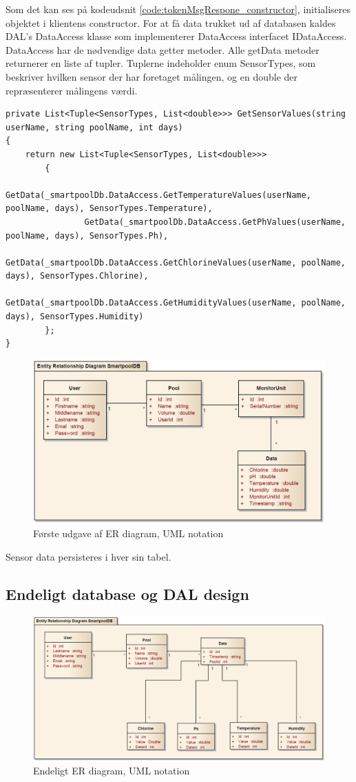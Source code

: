 Som det kan ses på kodeudsnit \ref{code:tokenMsgRespone_constructor}, initialiseres objektet i klientens constructor.
For at få data trukket ud af databasen kaldes DAL's DataAccess klasse som implementerer DataAccess interfacet IDataAccess. DataAccess har de nødvendige data getter metoder. Alle getData metoder returnerer en liste af tupler. Tuplerne indeholder enum SensorTypes, som beskriver hvilken sensor der har foretaget målingen, og en double der repræsenterer målingens værdi.

\begin{lstlisting}
private List<Tuple<SensorTypes, List<double>>> GetSensorValues(string userName, string poolName, int days)
{
	return new List<Tuple<SensorTypes, List<double>>>
		{
				GetData(_smartpoolDb.DataAccess.GetTemperatureValues(userName, poolName, days), SensorTypes.Temperature),
				GetData(_smartpoolDb.DataAccess.GetPhValues(userName, poolName, days), SensorTypes.Ph),
				GetData(_smartpoolDb.DataAccess.GetChlorineValues(userName, poolName, days), SensorTypes.Chlorine),
				GetData(_smartpoolDb.DataAccess.GetHumidityValues(userName, poolName, days), SensorTypes.Humidity)
		};
}
\end{lstlisting}




\begin{figure}
	\centering
	\includegraphics[width=\linewidth]{figs/design/databaseERD_old_uml}
	\caption{Første udgave af ER diagram, UML notation}
	\label{fig:databaseERD_old_uml}
\end{figure}

Sensor data persisteres i hver sin tabel.

\subsection{Endeligt database og DAL design}

\begin{figure}
\centering
\includegraphics[width=\linewidth]{figs/design/databaseERD_final_uml}
\caption{Endeligt ER diagram, UML notation}
\label{fig:databaseERD_final_uml}
\end{figure}





